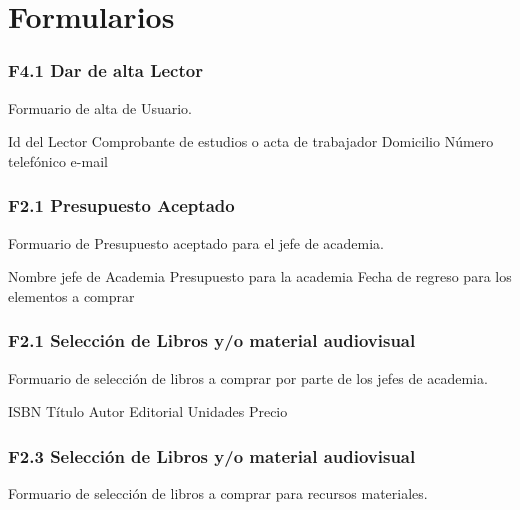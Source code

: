 \chapter{Formularios}
\label{appendix:Formularios}

\subsection{F4.1 Dar de alta Lector }
  Formuario de alta de Usuario.\\

	\begin{UClist}
      \UCli Id del Lector
      \UCli Comprobante de estudios o acta de trabajador
      \UCli Domicilio
      \UCli Número telefónico
      \UCli e-mail
    \end{UClist}




\subsection{F2.1 Presupuesto Aceptado}
Formuario de Presupuesto aceptado para el jefe de academia.\\

\begin{UClist}
	\UCli Nombre jefe de Academia
	\UCli Presupuesto para la academia
	\UCli Fecha de regreso para los elementos a comprar
\end{UClist}

\subsection{F2.1 Selección de Libros y/o material audiovisual}
Formuario de selección de libros a comprar por parte de los jefes de academia.\\

\begin{UClist}
	\UCli ISBN
	\UCli Título
	\UCli Autor
	\UCli Editorial
	\UCli Unidades
	\UCli Precio
\end{UClist}

\subsection{F2.3 Selección de Libros y/o material audiovisual}
Formuario de selección de libros a comprar para recursos materiales.\\

